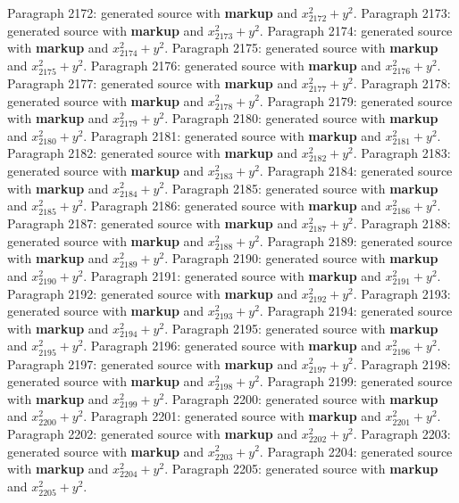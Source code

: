 \documentclass{article}
\begin{document}
Paragraph 2172: generated source with \textbf{markup} and $x_{2172}^2 + y^2$.
Paragraph 2173: generated source with \textbf{markup} and $x_{2173}^2 + y^2$.
Paragraph 2174: generated source with \textbf{markup} and $x_{2174}^2 + y^2$.
Paragraph 2175: generated source with \textbf{markup} and $x_{2175}^2 + y^2$.
Paragraph 2176: generated source with \textbf{markup} and $x_{2176}^2 + y^2$.
Paragraph 2177: generated source with \textbf{markup} and $x_{2177}^2 + y^2$.
Paragraph 2178: generated source with \textbf{markup} and $x_{2178}^2 + y^2$.
Paragraph 2179: generated source with \textbf{markup} and $x_{2179}^2 + y^2$.
Paragraph 2180: generated source with \textbf{markup} and $x_{2180}^2 + y^2$.
Paragraph 2181: generated source with \textbf{markup} and $x_{2181}^2 + y^2$.
Paragraph 2182: generated source with \textbf{markup} and $x_{2182}^2 + y^2$.
Paragraph 2183: generated source with \textbf{markup} and $x_{2183}^2 + y^2$.
Paragraph 2184: generated source with \textbf{markup} and $x_{2184}^2 + y^2$.
Paragraph 2185: generated source with \textbf{markup} and $x_{2185}^2 + y^2$.
Paragraph 2186: generated source with \textbf{markup} and $x_{2186}^2 + y^2$.
Paragraph 2187: generated source with \textbf{markup} and $x_{2187}^2 + y^2$.
Paragraph 2188: generated source with \textbf{markup} and $x_{2188}^2 + y^2$.
Paragraph 2189: generated source with \textbf{markup} and $x_{2189}^2 + y^2$.
Paragraph 2190: generated source with \textbf{markup} and $x_{2190}^2 + y^2$.
Paragraph 2191: generated source with \textbf{markup} and $x_{2191}^2 + y^2$.
Paragraph 2192: generated source with \textbf{markup} and $x_{2192}^2 + y^2$.
Paragraph 2193: generated source with \textbf{markup} and $x_{2193}^2 + y^2$.
Paragraph 2194: generated source with \textbf{markup} and $x_{2194}^2 + y^2$.
Paragraph 2195: generated source with \textbf{markup} and $x_{2195}^2 + y^2$.
Paragraph 2196: generated source with \textbf{markup} and $x_{2196}^2 + y^2$.
Paragraph 2197: generated source with \textbf{markup} and $x_{2197}^2 + y^2$.
Paragraph 2198: generated source with \textbf{markup} and $x_{2198}^2 + y^2$.
Paragraph 2199: generated source with \textbf{markup} and $x_{2199}^2 + y^2$.
Paragraph 2200: generated source with \textbf{markup} and $x_{2200}^2 + y^2$.
Paragraph 2201: generated source with \textbf{markup} and $x_{2201}^2 + y^2$.
Paragraph 2202: generated source with \textbf{markup} and $x_{2202}^2 + y^2$.
Paragraph 2203: generated source with \textbf{markup} and $x_{2203}^2 + y^2$.
Paragraph 2204: generated source with \textbf{markup} and $x_{2204}^2 + y^2$.
Paragraph 2205: generated source with \textbf{markup} and $x_{2205}^2 + y^2$.
\end{document}
